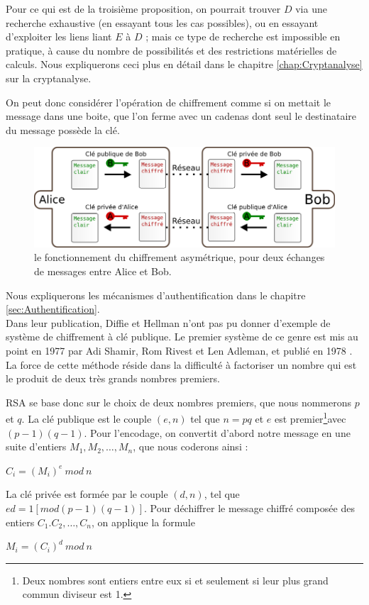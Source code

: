 Pour ce qui est de la troisième proposition, on pourrait trouver $D$
via une recherche exhaustive (en essayant tous les cas possibles), ou
en essayant d'exploiter les liens liant $E$ à $D$ ; mais ce type
de recherche est impossible en pratique, à cause du nombre de
possibilités et des restrictions matérielles de calculs. Nous
expliquerons ceci plus en détail dans le chapitre
\ref{chap:Cryptanalyse} sur la cryptanalyse.

On peut donc considérer l'opération de chiffrement comme si on
mettait le message dans une boite, que l'on ferme avec un cadenas
dont seul le destinataire du message possède la clé.

\begin{figure}[h]
  \begin{center}
    \includegraphics[scale=0.5]{images/ChiffrementAsymetrique.png}
  \end{center}
  \caption{le fonctionnement du chiffrement asymétrique, pour deux
    échanges de messages entre Alice et Bob.}
  \label{fig:ChiffrementSymetrique}
\end{figure}

Nous expliquerons les mécanismes d'authentification dans le 
chapitre \ref{sec:Authentification}. \\

\label{syst:RSA}
Dans leur publication, Diffie et Hellman n'ont pas pu donner
d'exemple de système de chiffrement à clé publique. Le premier
système de ce genre est mis au point en 1977 par Adi Shamir, Rom
Rivest et Len Adleman, et publié en 1978 \cite{RSAPaper}.
La force de cette méthode réside dans la difficulté à factoriser
un nombre qui est le produit de deux très grands nombres premiers. 

RSA se base donc sur le choix de deux nombres premiers, que nous
nommerons $p$ et $q$.
La clé publique est le couple $(e,n)$ tel que $n = p q$ et $e$ est
premier\footnote{Deux nombres sont entiers
entre eux si et seulement si leur plus grand commun diviseur est 1.}avec $(p-1) (q-1)$.
Pour l'encodage, on convertit d'abord notre message en une suite
d'entiers $M_1, M_2, \dots, M_n$, %
que nous coderons ainsi :
\begin{center}
  $C_i = (M_i)^e ~mod~n$
\end{center}

La clé privée est formée par le couple $(d,n)$, tel que
$e d = 1 [mod (p-1) (q-1)]$.
Pour déchiffrer le message chiffré composée des entiers $C_1. C_2,
\dots, C_n$, on applique la formule
\begin{center}
  $M_i = (C_i)^d ~mod~n$
\end{center}


